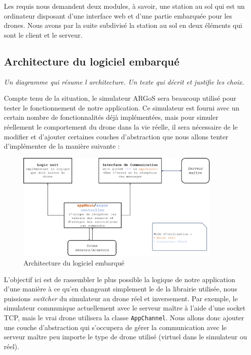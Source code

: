 \documentclass{mistcoursedoc}
\begin{document}
\par Les requis nous demandent deux modules, à savoir, une station au sol qui est un ordinateur disposant d’une interface web et d’une partie embarquée pour les drones. Nous avons par la suite subdivisé la station au sol en deux éléments qui sont le client et le serveur.

\subsection{Architecture du logiciel embarqué}
\textit{Un diagramme qui résume l architecture.  Un texte qui décrit et justifie les choix.}

Compte tenu de la situation, le simulateur ARGoS sera beaucoup utilisé pour tester le fonctionnement de notre application. Ce simulateur est fourni avec un certain nombre de fonctionnalités déjà implémentées, mais pour simuler réellement le comportement du drone dans la vie réelle, il sera nécessaire de le modifier et d'ajouter certaines couches d'abstraction que nous allons tenter d'implémenter de la manière suivante :

\begin{figure}[h!]
    \centering
    \includegraphics[width=0.9\textwidth]{firmware-architecture.png}
    \caption{Architecture du logiciel embarqué}
\end{figure}

L'objectif ici est de rassembler le plus possible la logique de notre application d'une manière à ce qu'en changeant simplement le  de la librairie utilisée, nous puissions \textit{switcher} du simulateur au drone réel et inversement. Par exemple, le simulateur communique actuellement avec le serveur maître à l'aide d'une socket TCP, mais le vrai drone utilisera la classe \texttt{AppChannel}. Nous allons donc ajouter une couche d'abstraction qui s'occupera de gérer la communication avec le serveur maître peu importe le type de drone utilisé (virtuel dans le simulateur ou réel).
\end{document}
